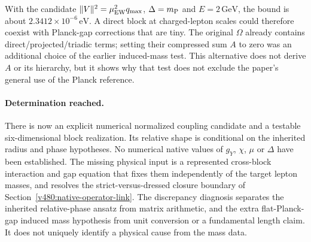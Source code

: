 With the candidate $\|V\|^2=\mu_{\rm EW}^2q_{\max}$,
$\Delta=m_{\rm P}$ and $E=2\,\mathrm{GeV}$, the bound is about
$2.3412\times10^{-6}\,\mathrm{eV}$. A direct block at charged-lepton
scales could therefore coexist with Planck-gap corrections that are
tiny. The original $\Omega$ already contains direct/projected/triadic
terms; setting their compressed sum $A$ to zero was an additional
choice of the earlier induced-mass test. This alternative does not
derive $A$ or its hierarchy, but it shows why that test does not
exclude the paper's general use of the Planck reference.

\paragraph{Determination reached.}
There is now an explicit numerical normalized coupling candidate
and a testable six-dimensional block realization. Its relative
shape is conditional on the inherited radius and phase hypotheses.
No numerical native values of $g_Y$, $\chi$, $\mu$ or $\Delta$
have been established. The missing physical input is a represented
cross-block interaction and gap equation that fixes them independently
of the target lepton masses, and resolves the strict-versus-dressed
closure boundary of Section~\ref{v480:native-operator-link}.
The discrepancy diagnosis separates the inherited relative-phase
ansatz from matrix arithmetic, and the extra flat-Planck-gap induced
mass hypothesis from unit conversion or a fundamental length claim.
It does not uniquely identify a physical cause from the mass data.

